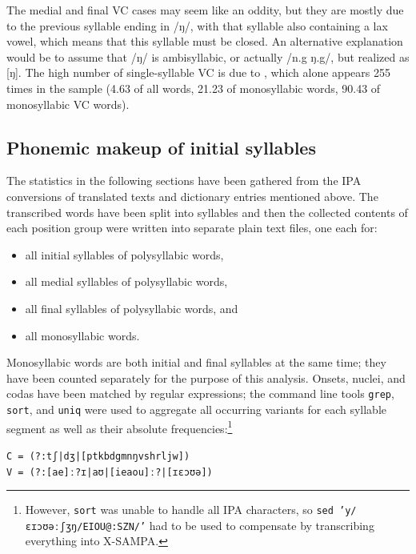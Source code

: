 %
The medial and final VC cases may seem like an oddity, but they are mostly due
to the previous syllable ending in /ŋ/, with that syllable also containing a
lax vowel, which means that this syllable must be closed. An alternative
explanation would be to assume that /ŋ/ is ambisyllabic, or actually /n.g%
\til{}ŋ.g/, but realized as [ŋ].\label{ŋ} The high number of 
single-syllable VC is due to , which alone appears 255 
times in the sample (4.63\pct{} of all words, 21.23\pct{} of monosyllabic 
words, 90.43\pct{} of monosyllabic VC words).

\subsection{Phonemic makeup of initial syllables}

%
The statistics in the following sections have been gathered from the IPA 
conversions of translated texts and dictionary entries mentioned above. The 
transcribed words have been split into syllables and then the collected 
contents 
of each position group were written into separate plain text files, one each 
for:

\begin{itemize}
	\item all initial syllables of polysyllabic words,
	\item all medial syllables of polysyllabic words,
	\item all final syllables of polysyllabic words, and 
	\item all monosyllabic words.
\end{itemize}

Monosyllabic words are both initial and final syllables at the same time; they 
have been counted separately for the purpose of this analysis. Onsets, nuclei, 
and codas have been matched by regular expressions; the com\-mand line tools 
\texttt{grep}, \texttt{sort}, and \texttt{uniq} were used to aggregate all 
occurring variants for each syllable segment as well as their absolute 
frequencies:\footnote{However, \texttt{sort} was unable to handle all IPA 
characters, so \texttt{sed 'y/ɛɪɔʊəːʃʒŋ/EIOU@:SZN/'} had to be used to 
compensate by transcribing everything into X-SAMPA.}

\ex
	\texttt{C = (?:tʃ|dʒ|[ptkbdgmnŋvshrljw])\\
	V = (?:[ae]ː?ɪ|aʊ|[ieaou]ː?|[ɪɛɔʊə])}
\xe

